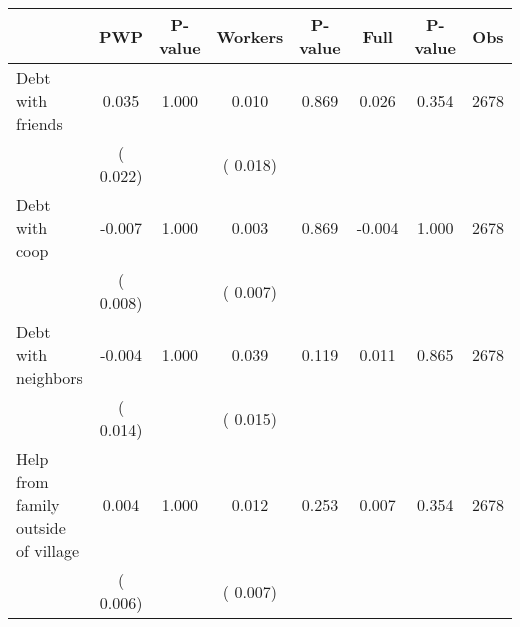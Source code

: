 
\begin{tabular}{l*{7}{c}}\hline&\multicolumn{1}{c}{PWP}&\multicolumn{1}{c}{P-value}&\multicolumn{1}{c}{Workers}&\multicolumn{1}{c}{P-value}&\multicolumn{1}{c}{Full}&\multicolumn{1}{c}{P-value}&\multicolumn{1}{c}{Obs} \\ \hline

 Debt with friends       &              0.035       &        1.000  &              0.010       &        0.869  &              0.026       &              0.354 &  2678 \\ 
                       &       (       0.022)             &                               &       (       0.018)                     &                               &                                               &                                &                      \\ 

 Debt with coop       &             -0.007       &        1.000  &              0.003       &        0.869  &             -0.004       &              1.000 &  2678 \\ 
                       &       (       0.008)             &                               &       (       0.007)                     &                               &                                               &                                &                      \\ 

 Debt with neighbors       &             -0.004       &        1.000  &              0.039       &        0.119  &              0.011       &              0.865 &  2678 \\ 
                       &       (       0.014)             &                               &       (       0.015)                     &                               &                                               &                                &                      \\ 

 Help from family outside of village       &              0.004       &        1.000  &              0.012       &        0.253  &              0.007       &              0.354 &  2678 \\ 
                       &       (       0.006)             &                               &       (       0.007)                     &                               &                                               &                                &                      \\ 


\end{tabular}
